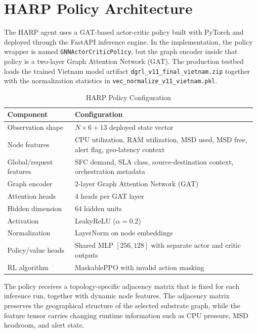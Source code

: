 \documentclass[12pt, a4paper, reqno, oneside]{book}
\begin{document}
\chapter{HARP Policy Architecture}
\label{appendix:neural_arch}
The HARP agent uses a GAT-based actor-critic policy built with PyTorch and deployed through the FastAPI inference engine. In the implementation, the policy wrapper is named \texttt{GNNActorCriticPolicy}, but the graph encoder inside that policy is a two-layer Graph Attention Network (GAT). The production testbed loads the trained Vietnam model artifact \texttt{dgrl\_v11\_final\_vietnam.zip} together with the normalization statistics in \texttt{vec\_normalize\_v11\_vietnam.pkl}.

\begin{table}[H]
\centering
\caption{HARP Policy Configuration}
\label{table:appendix_policy_config}
\small
\begin{tabular}{p{4.0cm}p{9.5cm}}
\toprule
\textbf{Component} & \textbf{Configuration} \\
\midrule
Observation shape & $N \times 6 + 13$ deployed state vector \\
Node features & CPU utilization, RAM utilization, MSD used, MSD free, alert flag, geo-latency context \\
Global/request features & SFC demand, SLA class, source-destination context, orchestration metadata \\
Graph encoder & 2-layer Graph Attention Network (GAT) \\
Attention heads & 4 heads per GAT layer \\
Hidden dimension & 64 hidden units \\
Activation & LeakyReLU ($\alpha=0.2$) \\
Normalization & LayerNorm on node embeddings \\
Policy/value heads & Shared MLP $[256, 128]$ with separate actor and critic outputs \\
RL algorithm & MaskablePPO with invalid action masking \\
\bottomrule
\end{tabular}
\end{table}

The policy receives a topology-specific adjacency matrix that is fixed for each inference run, together with dynamic node features. The adjacency matrix preserves the geographical structure of the selected substrate graph, while the feature tensor carries changing runtime information such as CPU pressure, MSD headroom, and alert state.
\end{document}
